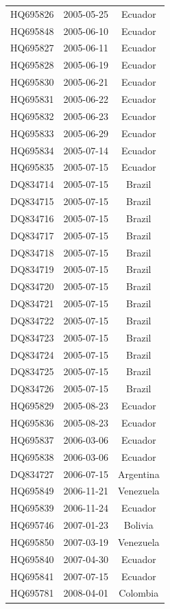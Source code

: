\documentclass[a4paper,10pt]{article}
\begin{document}
\begin{center}
\begin{longtable}{ccc}
HQ695826 & 2005-05-25 & Ecuador \\
HQ695848 & 2005-06-10 & Ecuador \\
HQ695827 & 2005-06-11 & Ecuador \\
HQ695828 & 2005-06-19 & Ecuador \\
HQ695830 & 2005-06-21 & Ecuador \\
HQ695831 & 2005-06-22 & Ecuador \\
HQ695832 & 2005-06-23 & Ecuador \\
HQ695833 & 2005-06-29 & Ecuador \\
HQ695834 & 2005-07-14 & Ecuador \\
HQ695835 & 2005-07-15 & Ecuador \\
DQ834714 & 2005-07-15 & Brazil \\
DQ834715 & 2005-07-15 & Brazil \\
DQ834716 & 2005-07-15 & Brazil \\
DQ834717 & 2005-07-15 & Brazil \\
DQ834718 & 2005-07-15 & Brazil \\
DQ834719 & 2005-07-15 & Brazil \\
DQ834720 & 2005-07-15 & Brazil \\
DQ834721 & 2005-07-15 & Brazil \\
DQ834722 & 2005-07-15 & Brazil \\
DQ834723 & 2005-07-15 & Brazil \\
DQ834724 & 2005-07-15 & Brazil \\
DQ834725 & 2005-07-15 & Brazil \\
DQ834726 & 2005-07-15 & Brazil \\
HQ695829 & 2005-08-23 & Ecuador \\
HQ695836 & 2005-08-23 & Ecuador \\
HQ695837 & 2006-03-06 & Ecuador \\
HQ695838 & 2006-03-06 & Ecuador \\
DQ834727 & 2006-07-15 & Argentina \\
HQ695849 & 2006-11-21 & Venezuela \\
HQ695839 & 2006-11-24 & Ecuador \\
HQ695746 & 2007-01-23 & Bolivia \\
HQ695850 & 2007-03-19 & Venezuela \\
HQ695840 & 2007-04-30 & Ecuador \\
HQ695841 & 2007-07-15 & Ecuador \\
HQ695781 & 2008-04-01 & Colombia \\

\end{longtable}
\end{center}
\end{document}
